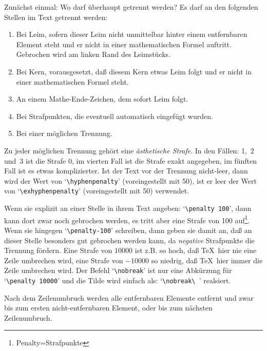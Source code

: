 Zun\"achst einmal: Wo darf \"uberhaupt getrennt werden? Es darf an den
folgenden Stellen im Text getrennt werden:
\begin{enumerate}
\item Bei Leim, sofern dieser Leim nicht unmittelbar hinter einem
entfernbaren Element steht und er nicht in einer mathematischen Formel
auftritt. Gebrochen wird am linken
Rand des Leimst\"ucks.
\item Bei Kern, vorausgesetzt, da\ss{} diesem Kern etwas Leim folgt und er
nicht in einer mathematischen Formel steht.
\item An einem Mathe-Ende-Zeichen, dem sofort Leim folgt.
\item Bei Strafpunkten, die eventuell automatisch eingef\"ugt wurden.
\item Bei einer m\"oglichen Trennung.
\end{enumerate}
Zu jeder m\"oglichen Trennung geh\"ort eine {\em \"asthetische
Strafe}. In
den F\"allen: 1,~2 und~3 ist die Strafe 0, im vierten Fall ist die
Strafe exakt angegeben, im f\"unften Fall ist es etwas komplizierter.
Ist der Text vor der Trennung nicht-leer, dann wird der Wert von
`\verb|\hyphenpenalty|' (voreingestellt mit 50), ist er leer der Wert
von 
`\verb|\exhyphenpenalty|' (voreingestellt mit 50) verwendet.

Wenn sie explizit an einer Stelle in ihrem Text angeben:
`\verb|\penalty 100|', dann kann dort zwar noch gebrochen werden, es
tritt aber eine Strafe von 100 auf\footnote{Penalty=Strafpunkte}.
Wenn sie hingegen `\verb|\penalty-100|' schreiben, dann geben sie damit an,
da\ss{} an dieser Stelle besonders gut gebrochen werden kann, da {\em
negative} Strafpunkte die Trennung f\"ordern. Eine Strafe von $10000$ ist
z.B. so hoch, da\ss{} \TeX\ hier nie eine Zeile umbrechen wird, eine
Strafe von $-10000$ so niedrig, da\ss{} \TeX\ hier immer die Zeile
umbrechen wird. Der Befehl 
`\verb|\nobreak|' ist nur eine
Abk\"urzung
f\"ur `\verb|\penalty 10000|' und die Tilde wird einfach als:
`\verb*|\nobreak\ |' realsiert.

Nach dem Zeilenumbruch werden alle entfernbaren Elemente entfernt und
zwar bis zum ersten nicht-entfernbaren Element, oder bis zum n\"achsten
Zeilenumbruch.

